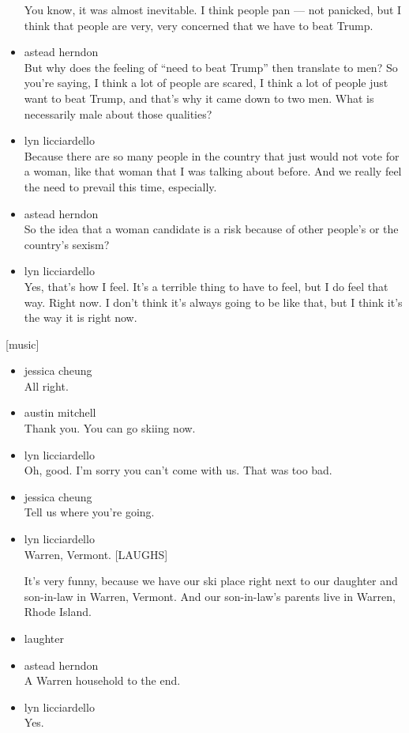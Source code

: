 \begin{itemize}
  You know, it was almost inevitable. I think people pan --- not
  panicked, but I think that people are very, very concerned that we
  have to beat Trump.
\item
  astead herndon\\
  But why does the feeling of ``need to beat Trump'' then translate to
  men? So you're saying, I think a lot of people are scared, I think a
  lot of people just want to beat Trump, and that's why it came down to
  two men. What is necessarily male about those qualities?
\item
  lyn licciardello\\
  Because there are so many people in the country that just would not
  vote for a woman, like that woman that I was talking about before. And
  we really feel the need to prevail this time, especially.
\item
  astead herndon\\
  So the idea that a woman candidate is a risk because of other people's
  or the country's sexism?
\item
  lyn licciardello\\
  Yes, that's how I feel. It's a terrible thing to have to feel, but I
  do feel that way. Right now. I don't think it's always going to be
  like that, but I think it's the way it is right now.
\end{itemize}

{[}music{]}

\begin{itemize}
\item
  jessica cheung\\
  All right.
\item
  austin mitchell\\
  Thank you. You can go skiing now.
\item
  lyn licciardello\\
  Oh, good. I'm sorry you can't come with us. That was too bad.
\item
  jessica cheung\\
  Tell us where you're going.
\item
  lyn licciardello\\
  Warren, Vermont. {[}LAUGHS{]}

  It's very funny, because we have our ski place right next to our
  daughter and son-in-law in Warren, Vermont. And our son-in-law's
  parents live in Warren, Rhode Island.
\item
  laughter
\item
  astead herndon\\
  A Warren household to the end.
\item
  lyn licciardello\\
  Yes.
\end{itemize}

